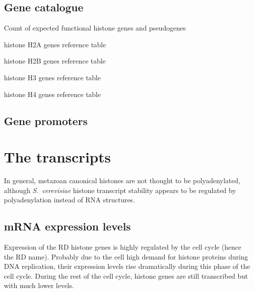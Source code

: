 \documentclass[10pt,a4paper,twocolumn,article]{memoir}
\begin{document}
    \subsection{Gene catalogue}

      \begin{table}
        \caption{Count of expected functional histone genes and pseudogenes}
        \label{tab:histone-gene-count}
        \centering
%        
      \end{table}

      \begin{table}
        \caption{histone H2A genes reference table}
        \label{tab:H2A-ref}
        \centering
        
      \end{table}

      \begin{table}
        \caption{histone H2B genes reference table}
        \label{tab:H2B-ref}
        \centering
        
      \end{table}

      \begin{table}
        \caption{histone H3 genes reference table}
        \label{tab:H3-ref}
        \centering
        
      \end{table}

      \begin{table}
        \caption{histone H4 genes reference table}
        \label{tab:H4-ref}
        \centering
        
      \end{table}


    \subsection{Gene promoters}

  \section{The transcripts}

    In general, metazoan canonical histones
    are not thought to be polyadenylated, although \textit{S.\ cerevisiae} histone transcript stability
    appears to be regulated by polyadenylation instead of RNA structures.

    \subsection{mRNA expression levels}
      Expression of the RD histone genes is highly regulated by the cell cycle (hence the RD name). Probably due
      to the cell high demand for histone proteins during DNA replication, their expression levels rise dramatically
      during this phase of the cell cycle. During the rest of the cell cycle, histone genes are still transcribed
      but with much lower levels.
\end{document}
